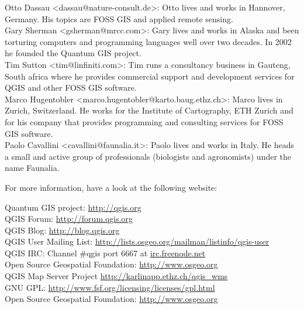 Otto Dassau <dassau@nature-consult.de>: Otto lives and works in Hannover,
Germany. His topics are FOSS GIS and applied remote sensing.
\\Gary Sherman <gsherman@mrcc.com>: Gary lives and works in Alaska and been
torturing computers and programming languages well over two decades. In 2002
he founded the Quantum GIS project. 
\\Tim Sutton <tim@linfiniti.com>: Tim runs a consultancy business in
Gauteng, South africa where he provides commercial support and development
services for QGIS and other FOSS GIS software.
\\Marco Hugentobler <marco.hugentobler@karto.baug.ethz.ch>: Marco lives in
Zurich, Switzerland. He works for the Institute of Cartography, ETH Zurich
and for his company that provides programming and consulting services for
FOSS GIS software.
\\Paolo Cavallini <cavallini@faunalia.it>: Paolo lives and works in Italy. He
heads a small and active group of professionals (biologists and agronomists)
under the name Faunalia.


For more information, have a look at the following website:

Quantum GIS project: \url{http://qgis.org}
\\QGIS Forum: \url{http://forum.qgis.org}
\\QGIS Blog: \url{http://blog.qgis.org}
\\QGIS User Mailing List: \url{http://lists.osgeo.org/mailman/listinfo/qgis-user}
\\QGIS IRC: Channel \#qgis port 6667 at \url{irc.freenode.net}
\\Open Source Geospatial Foundation: \url{http://www.osgeo.org}
\\QGIS Map Server Project \url{http://karlinapp.ethz.ch/qgis\_wms}
\\GNU GPL: \url{http://www.fsf.org/licensing/licenses/gpl.html}
\\Open Source Geospatial Foundation: \url{http://www.osgeo.org}



